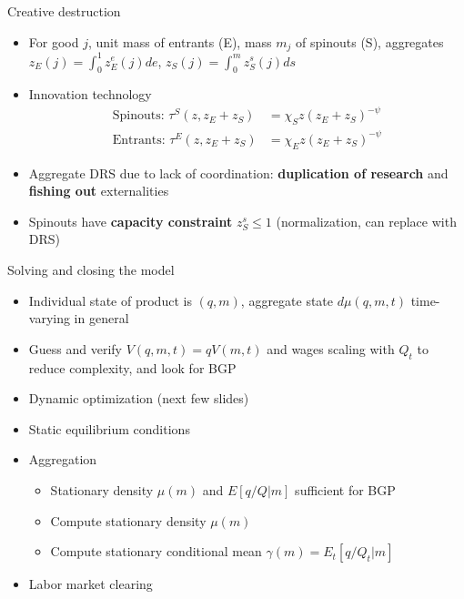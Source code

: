 \documentclass[english,usenames,dvipsnames]{beamer}
\begin{document}
\begin{frame}{Creative destruction}
\begin{itemize}
	\item For good $j$, unit mass of entrants (E), mass $m_j$ of spinouts (S), aggregates $z_E(j) = \int_0^1 z_E^e(j) de$, $z_S(j) = \int_0^{m} z_S^s(j) ds$
	\item Innovation technology
	\begin{align*}
	\textrm{Spinouts: }\tau^S(z,z_E+z_S) &= \chi_{S} z (z_E + z_S)^{-\psi} \\
	\textrm{Entrants: }\tau^E(z,z_E+z_S) &= \chi_{E} z (z_E + z_S)^{-\psi}
	\end{align*}
	\item Aggregate DRS due to lack of coordination: \textbf{\alert{duplication of research}} and \textbf{\alert{fishing out}} externalities
	\item Spinouts have \textbf{\alert{capacity constraint}} $z_S^s \le 1$ (normalization, can replace with DRS)
\end{itemize}
\end{frame}

\begin{frame}{Solving and closing the model}\label{closing_the_model}
\begin{itemize}
	\item Individual state of product is $(q,m)$, aggregate state $d\mu(q,m,t)$ time-varying in general
	\item Guess and verify $V(q,m,t) = qV(m,t)$ and wages scaling with $Q_t$ to reduce complexity, and look for BGP \hyperlink{scaling_of_value_functions}{}
	\item Dynamic optimization (next few slides)
	\item Static equilibrium conditions \hyperlink{static_eq_conditions}{}
	\item Aggregation 
	\begin{itemize}
		\item Stationary density $\mu(m)$ and $E[q/Q|m]$ sufficient for BGP \hyperlink{aggregate_distribution_and_bgp}{}
		\item Compute stationary density $\mu(m)$  \hyperlink{aggregation}{}
		\item Compute stationary conditional mean $\gamma(m) = E_t[q/Q_t|m]$ \hyperlink{aggregation}{}
	\end{itemize}
	\item Labor market clearing
\end{itemize}
\end{frame}
\end{document}
